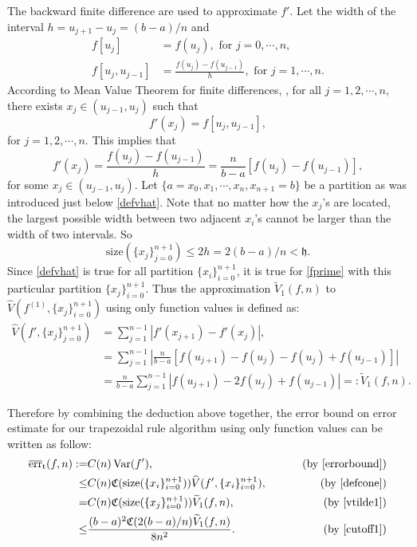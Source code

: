 \documentclass{iitthesis}
\DeclareMathOperator{\Var}{Var}
\theoremstyle{definition}
\theoremstyle{remark}
\begin{document}
The backward finite difference are used to approximate $f'$. Let the width of the interval $h=u_{j+1}-u_{j}=(b-a)/n$ and
\begin{align*}
  f[u_{j}]&=f(u_{j}), \text{ for } j=0,\cdots, n,\\
  f[u_{j},u_{j-1}]&=\frac{f(u_{j})-f(u_{j-1})}{h},\text{ for } j=1, \cdots, n.
\end{align*}
According to Mean Value Theorem for finite differences, , for all $j=1,2,\cdots,n$, there exists $x_j\in (u_{j-1},u_{j})$ such that
\begin{equation*}
   f'(x_j)= f[u_{j},u_{j-1}],
\end{equation*}
for $j = 1, 2, \cdots, n.$ This implies that
\begin{equation}\label{fprime}
  f'(x_j)=\frac{f(u_{j})-f(u_{j-1})}{h}=\frac{n}{b-a}[f(u_{j})-f(u_{j-1})],
\end{equation}
for some $x_j\in (u_{j-1},u_{j})$. Let $\{a=x_{0}, x_{1},\cdots,x_{n},x_{n+1}=b\}$ be a partition as was introduced just below \eqref{defvhat}. Note that no matter how the $x_j$'s are located, the largest possible width between two adjacent $x_{i}$'s cannot be larger than the width of two intervals. So
\begin{equation}\label{cutoff1}
  \text{size}(\{x_j\}_{j=0}^{n+1})\leq 2h=2(b-a)/n<\mathfrak{h}.
\end{equation}
Since \eqref{defvhat} is true for all partition $\{x_i\}_{i=0}^{n+1}$, it is true for \eqref{fprime} with this particular partition $\{x_j\}_{i=0}^{n+1}$. Thus the approximation $\widetilde{V}_1(f,n)$ to $\widehat{V}(f^{(1)},\{x_j\}_{i=0}^{n+1})$ using only function values is defined as:
\begin{align}\label{vtilde1}
\nonumber    \widehat{V}(f',\{x_j\}_{j=0}^{n+1})&= \sum_{j=1}^{n-1}\left|f'(x_{j+1})-f'(x_{j})\right|,\\
\nonumber    &=\sum_{j=1}^{n-1}\left|\frac{n}{b-a}[f(u_{j+1})-f(u_{j})-f(u_{j})+f(u_{j-1})]\right|\\
    &=\frac{n}{b-a}\sum_{j=1}^{n-1}\left|f(u_{j+1})-2f(u_{j})+f(u_{j-1})\right|=:\widetilde{V}_1(f,n).
\end{align}

Therefore by combining the deduction above together, the error bound on error estimate for our trapezoidal rule algorithm using only function values can be written as follow:
\begin{align*}
\overline{\text{err}}_{\text{t}}(f,n):=&C(n)\Var(f'),\qquad &\text{ (by \eqref{errorbound})}\\
\leq & C(n)\mathfrak{C}(\text{size}(\{x_i\}_{i=0}^{n+1}))\widehat{V}(f',\{x_i\}_{i=0}^{n+1}), \qquad &\text{ (by \eqref{defcone})}\\
=& C(n)\mathfrak{C}(\text{size}(\{x_j\}_{i=0}^{n+1}))\widetilde{V}_1(f,n), \qquad &\text{ (by \eqref{vtilde1})}\\
  \leq & \frac{(b-a)^2\mathfrak{C}(2(b-a)/n)\widetilde{V}_1(f,n)}{8n^2}.\qquad &\text{ (by \eqref{cutoff1})}
\end{align*}
\end{document}
